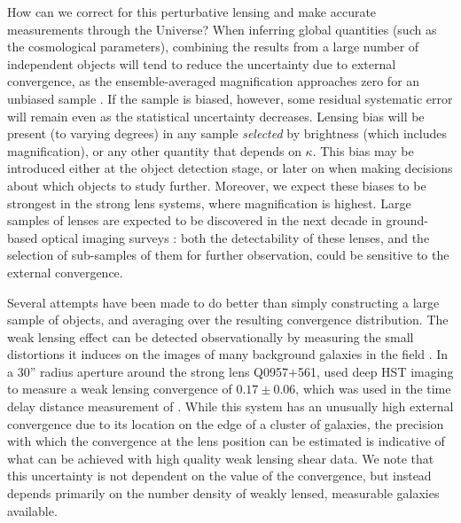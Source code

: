 \documentclass[useAMS,usenatbib]{mn2e}
\begin{document}
How can we correct for this perturbative lensing and make accurate
measurements through the Universe? When inferring global quantities
(such as the cosmological parameters), combining the results from a
large number of independent objects will tend to reduce the uncertainty
due to external convergence, as the ensemble-averaged magnification
approaches zero for an unbiased sample \citep[\eg][]{Holz+Linder2005}.
If the sample is biased, however, some residual systematic error will
remain even as the statistical uncertainty decreases. Lensing bias will
be present (to varying degrees) in any sample {\it selected} by
brightness (which includes magnification), or any other quantity that
depends on $\kappa$. This bias may be introduced either at the object
detection stage, or later on when making decisions about which objects
to study further.  Moreover, we expect these biases to be strongest in
the strong lens systems, where magnification is highest. Large samples
of lenses are expected to be discovered in the next decade in
ground-based optical imaging surveys \citep{Oguri+Marshall2010}: both
the detectability of these lenses,  and the selection of sub-samples of
them for further observation, could be sensitive to the external
convergence. 

Several attempts have been made to do better than simply constructing a
large sample of objects, and averaging over the resulting convergence
distribution. The weak lensing effect can be detected observationally 
by measuring the
small distortions it induces on the images of many background galaxies
in the field \citep[see e.g.][for a review]{Schneider2006}. In a 30''
radius aperture around the strong lens Q0957$+$561,
\citet{NakajimaEtal2009} used deep HST imaging to measure a weak lensing
convergence of $0.17\pm0.06$, which was used in the time delay distance
measurement of \citep{FadelyEtal2009}. While this system has an
unusually high external convergence due to its location on the edge of a
cluster of galaxies, the precision with which the convergence at the
lens position can be estimated is indicative of what can be achieved
with high quality weak lensing shear data. We note that this uncertainty
is not dependent on the value of the convergence, but instead depends
primarily on the number density of weakly lensed, measurable galaxies
available. 
\end{document}
